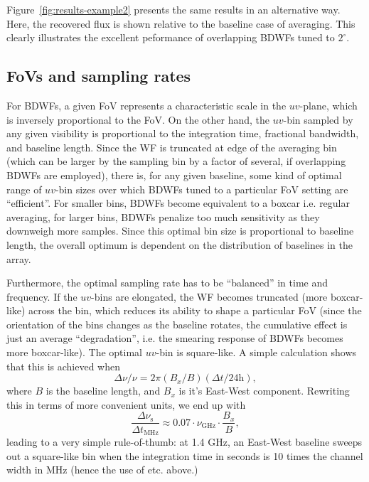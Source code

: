 \documentclass[useAMS,usenatbib]{mn2e}
\begin{document}
Figure~\ref{fig:results-example2} presents the same results in an alternative way. Here, the recovered flux is shown 
relative to the baseline case of  averaging. This clearly illustrates the excellent peformance of overlapping
BDWFs tuned to $2^\circ$.

\subsection{FoVs and sampling rates}

For BDWFs, a given FoV represents a characteristic scale in the $uv$-plane, which is inversely proportional to the FoV. 
On the other hand, the $uv$-bin sampled by any given visibility is proportional to the integration time,
fractional bandwidth, and baseline length. Since the WF is truncated at edge of the averaging bin (which can be
larger by the sampling bin by a factor of several, if overlapping BDWFs are employed), there is, for any given baseline,
some kind of optimal range of $uv$-bin sizes over which BDWFs tuned to a particular FoV setting are ``efficient''. For 
smaller bins, BDWFs become equivalent to a boxcar i.e. regular averaging, for larger bins, BDWFs penalize too much
sensitivity as they downweigh more samples. Since this optimal bin size is proportional to baseline length, the overall
optimum is dependent on the distribution of baselines in the array. 

Furthermore, the optimal sampling rate has to be ``balanced'' in time and frequency. If the $uv$-bins are elongated, 
the WF becomes truncated (more boxcar-like) across the bin, which reduces its ability to shape a 
particular FoV (since the orientation of the bins changes as the baseline rotates, the cumulative effect is just an
average ``degradation'', i.e. the smearing response of BDWFs becomes more boxcar-like). The optimal $uv$-bin is square-like.
A simple calculation shows that this is achieved when
\begin{equation}
\Delta \nu/\nu = 2 \pi (B_x/B)(\Delta t/24\mathrm{h}),
\end{equation}
where $B$ is the baseline length, and $B_x$ is it's East-West component. Rewriting this in terms of more convenient units,
we end up with 
\begin{equation}
\frac{\Delta \nu_\mathrm{s}}{\Delta t_\mathrm{MHz}} \approx 0.07 \cdot \nu_\mathrm{GHz} \cdot \frac{B_x}{B} , 
\end{equation}
leading to a very simple rule-of-thumb: at 1.4 GHz, an East-West baseline sweeps out a square-like bin when the 
integration time in seconds is 10 times the channel width in MHz (hence the use of  etc. above.) 
\end{document}
